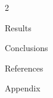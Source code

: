 \documentclass[a4paper]{article}
\begin{document}
\begin{multicols}{2}
    \begin{section}{Results}
        
    \end{section}
    
    \begin{section}{Conclusions}
        
    \end{section}
    
    \begin{section}{References}
        
    \end{section}
    
    \begin{section}{Appendix}
        
    \end{section}
\end{multicols}
\end{document}
